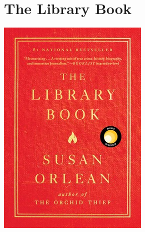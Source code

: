 \documentclass{tufte-handout}
\makeatletter
\newcommand{\varcaption}[2][0pt]{%
  \gsetlength{\@tufte@caption@vertical@offset}{-#1}%
  \gdef\@tufte@stored@varcaption{#2}%
}
\gdef\@tufte@stored@varcaption{} %
\makeatother
\begin{document}
\section*{The Library Book}
\begin{marginfigure}[2\baselineskip]
   \includegraphics[width=\linewidth]{images/library_book.jpg}
   \varcaption{\href{https://www.simonandschuster.com/books/The-Library-Book/Susan-Orlean/9781476740188}{Publisher Link}, \href{https://www.amazon.com/Library-Book-Susan-Orlean/dp/1476740194/}{Amazon Link}}
\end{marginfigure}
\end{document}

